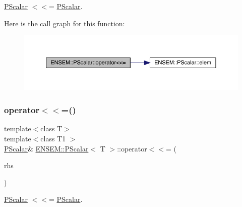 \mbox{\hyperlink{classENSEM_1_1PScalar}{P\+Scalar}} $<$$<$= \mbox{\hyperlink{classENSEM_1_1PScalar}{P\+Scalar}}. 

Here is the call graph for this function\+:
\nopagebreak
\begin{figure}[H]
\begin{center}
\leavevmode
\includegraphics[width=350pt]{d3/d27/classENSEM_1_1PScalar_ade643675ab6ef041676e1098ac740b29_cgraph}
\end{center}
\end{figure}
\mbox{\label{classENSEM_1_1PScalar_ade643675ab6ef041676e1098ac740b29}} 
\subsubsection{\texorpdfstring{operator$<$$<$=()}{operator<<=()}\hspace{0.1cm}{\footnotesize\ttfamily [2/2]}}
{\footnotesize\ttfamily template$<$class T$>$ \\
template$<$class T1 $>$ \\
\mbox{\hyperlink{classENSEM_1_1PScalar}{P\+Scalar}}\& \mbox{\hyperlink{classENSEM_1_1PScalar}{E\+N\+S\+E\+M\+::\+P\+Scalar}}$<$ T $>$\+::operator$<$$<$= (\begin{DoxyParamCaption}\item[{const \mbox{\hyperlink{classENSEM_1_1PScalar}{P\+Scalar}}$<$ T1 $>$ \&}]{rhs }\end{DoxyParamCaption})\hspace{0.3cm}{\ttfamily [inline]}}



\mbox{\hyperlink{classENSEM_1_1PScalar}{P\+Scalar}} $<$$<$= \mbox{\hyperlink{classENSEM_1_1PScalar}{P\+Scalar}}. 

